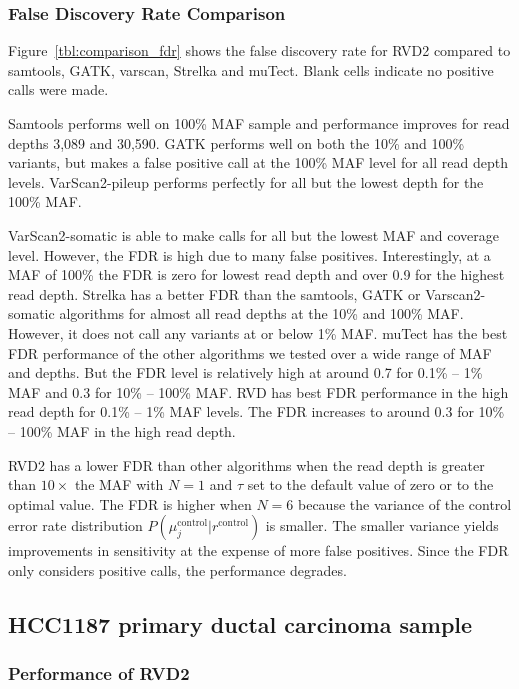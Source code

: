 \documentclass{bioinfo}
\begin{document}
\subsubsection*{False Discovery Rate Comparison}

Figure~\ref{tbl:comparison_fdr} shows the false discovery rate for RVD2 compared to samtools, GATK, varscan, Strelka and muTect. Blank cells indicate no positive calls were made.

Samtools performs well on 100\% MAF sample and performance improves for read depths 3,089 and 30,590. GATK performs well on both the 10\% and 100\% variants, but makes a false positive call at the 100\% MAF level for all read depth levels. VarScan2-pileup performs perfectly for all but the lowest depth for the 100\% MAF.

VarScan2-somatic is able to make calls for all but the lowest MAF and coverage level. However, the FDR is high due to many false positives. Interestingly, at a MAF of 100\% the FDR is zero for lowest read depth and over 0.9 for the highest read depth. Strelka has a better FDR than the samtools, GATK or Varscan2-somatic algorithms for almost all read depths at the 10\% and 100\% MAF. However, it does not call any variants at or below 1\% MAF.  muTect has the best FDR performance of the other algorithms we tested over a wide range of MAF and depths. But the FDR level is relatively high at around 0.7 for 0.1\% -- 1\% MAF and 0.3 for 10\% -- 100\% MAF. RVD has best FDR performance in the high read depth for 0.1\% -- 1\% MAF levels. The FDR increases to around 0.3 for 10\% -- 100\% MAF in the high read depth.

RVD2 has a lower FDR than other algorithms when the read depth is greater than $10\times$ the MAF with $N=1$ and $\tau$ set to the default value of zero or to the optimal value. The FDR is higher when $N=6$ because the variance of the control error rate distribution $P(\mu_j^{\text{control}} | r^{\text{control}})$ is smaller. The smaller variance yields improvements in sensitivity at the expense of more false positives. Since the FDR only considers positive calls, the performance degrades.

\subsection{HCC1187 primary ductal carcinoma sample}\label{sec:brca}
\subsubsection{Performance of RVD2}
\end{document}

